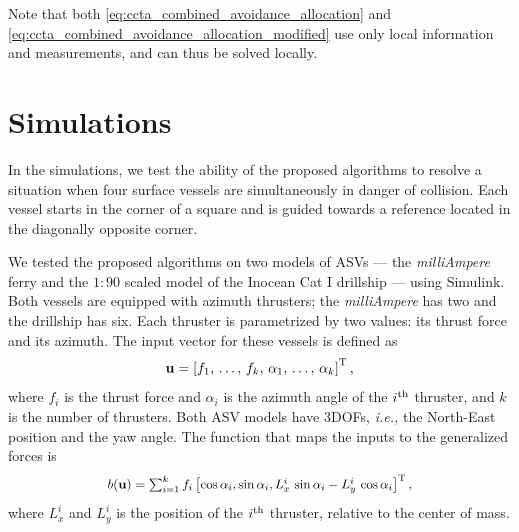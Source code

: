 Note that both \eqref{eq:ccta_combined_avoidance_allocation} and \eqref{eq:ccta_combined_avoidance_allocation_modified} use only local information and measurements, and can thus be solved locally.%

\vspace{-0mm}
\section{Simulations}
\vspace{-0mm}
\label{sec:ccta_simulations}
In the simulations, we test the ability of the proposed algorithms to resolve a situation when four surface vessels are simultaneously in danger of collision.
Each vessel starts in the corner of a square and is guided towards a reference located in the diagonally opposite corner.

We tested the proposed algorithms on two models of ASVs --- the \emph{milliAmpere} ferry \cite{pedersen_optimization_2019} and the $1:90$ scaled model of the Inocean Cat I drillship \cite{bjorno_thruster-assisted_2016} --- using Simulink.
Both vessels are equipped with azimuth thrusters; the \emph{milliAmpere} has two and the drillship has six.
Each thruster is parametrized by two values: its thrust force and its azimuth.
The input vector for these vessels is defined as \vspace{-2mm}
\begin{equation}
    \mathbf{u} = \left[ f_1 ,\, \ldots ,\, f_k ,\, \alpha_1 ,\, \ldots ,\, \alpha_k \right]^{\rm T},
\end{equation}
where $f_i$ is the thrust force and $\alpha_i$ is the azimuth angle of the $i^{\rm th}$ thruster, and $k$ is the number of thrusters.
%
Both ASV models have 3DOFs, \emph{i.e.,} the North-East position and the yaw angle.
The function that maps the inputs to the generalized forces is \vspace{-2mm}
\begin{equation}
    \scale[0.93]{b(\mathbf{u}) = \sum_{i=1}^k f_i \left[ \cos\alpha_i, \sin\alpha_i, L_x^i\,\sin\alpha_i - L_y^i\,\cos\alpha_i \right]^{\rm T},}
\end{equation}
where $L_x^i$ and $L_y^i$ is the position of the $i^{\rm th}$ thruster, relative to the center of mass.

